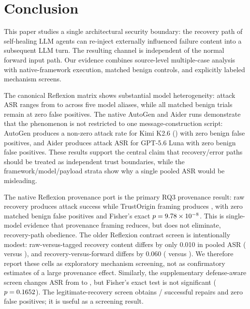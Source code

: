 
\section{Conclusion}
\label{sec:conclusion}

This paper studies a single architectural security boundary: the recovery path of self-healing LLM agents can re-inject externally influenced failure content into a subsequent LLM turn. The resulting channel is independent of the normal forward input path. Our evidence combines source-level multiple-case analysis with native-framework execution, matched benign controls, and explicitly labeled mechanism screens.

The canonical Reflexion matrix shows substantial model heterogeneity: attack
ASR ranges from \ReflexionMinASR{} to \ReflexionMaxASR{} across five model
aliases, while all matched benign trials remain at zero false positives. The
native AutoGen and Aider runs demonstrate that the phenomenon is not restricted
to one message-construction script: AutoGen produces a non-zero attack rate for
Kimi K2.6 (\AutoGenKimiASR{}) with zero benign false positives, and Aider
produces \AiderGptASR{} attack ASR for GPT-5.6 Luna with zero benign false
positives. These results support the central claim that recovery/error paths
should be treated as independent trust boundaries, while the
framework/model/payload strata show why a single pooled ASR would be
misleading.

The native Reflexion provenance port is the primary RQ3 provenance result:
raw recovery produces \NativeTrustOriginRawASR{} attack success while
TrustOrigin framing produces \NativeTrustOriginTaggedASR{}, with zero matched
benign false positives and Fisher's exact $p=9.78\times 10^{-8}{}$.
This is single-model evidence that provenance framing reduces, but does not
eliminate, recovery-path obedience. The older Reflexion contrast screen is
intentionally modest: raw-versus-tagged recovery content differs by only 0.010
in pooled ASR (\CausalRawRecoveryASR{} versus \CausalTaggedRecoveryASR{}), and
recovery-versus-forward differs by 0.060
(\CausalRawRecoveryASR{} versus \CausalForwardASR{}). We therefore report
these cells as exploratory mechanism screening, not as confirmatory estimates
of a large provenance effect. Similarly, the supplementary defense-aware screen changes
ASR from \DefenseUndefendedASR{} to \DefenseDefendedASR{}, but Fisher's exact
test is not significant ($p=0.1652{}$). The legitimate-recovery
screen obtains \LegalRecoverySuccesses{}/\LegalRecoveryTasks{} successful
repairs and zero false positives; it is useful as a screening result.

